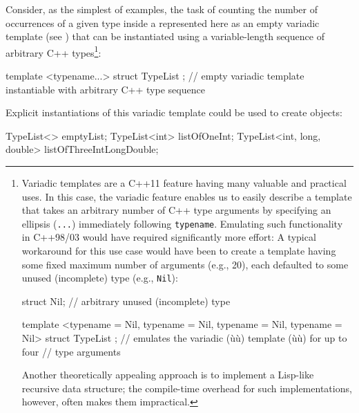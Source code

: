 Consider, as the simplest of examples, the task of counting the number
of occurrences of a given type inside a  represented
here as an empty variadic template (see ) that can be
instantiated using a variable-length sequence of arbitrary C++ types{\cprotect\footnote{Variadic templates are a C++11
  feature having many valuable and practical uses. In this case, the
  variadic feature enables us to easily describe a template that takes
  an arbitrary number of C++ type arguments by specifying an ellipsis
  (\lstinline!...!) immediately following \lstinline!typename!. Emulating such
  functionality in C++98/03 would have required significantly more
  effort: A typical workaround for this use case would have been to
  create a template having some fixed maximum number of arguments (e.g.,
  20), each defaulted to some unused (incomplete) type (e.g.,
  \lstinline!Nil!):

  \begin{emcppslisting}[style=footcode]
  struct Nil;  // arbitrary unused (incomplete) type

  template <typename = Nil, typename = Nil, typename = Nil, typename = Nil>
  struct TypeList { };
      // emulates the variadic (ù{}ù) template (ù{}ù) for up to four
      // type arguments
  \end{emcppslisting}

\vspace*{-1ex}      
\noindent Another theoretically appealing approach is to implement a Lisp-like
  recursive data structure; the compile-time overhead for such
  implementations, however, often makes them impractical.}}:

\begin{emcppslisting}[emcppsbatch=e2]
template <typename...> struct TypeList { };
    // empty variadic template instantiable with arbitrary C++ type sequence
\end{emcppslisting}
    
\noindent Explicit instantiations of this variadic template could be used to
create objects:

\begin{emcppslisting}[emcppsbatch=e2]
TypeList<>                  emptyList;
TypeList<int>               listOfOneInt;
TypeList<int, long, double> listOfThreeIntLongDouble;
\end{emcppslisting}
    
